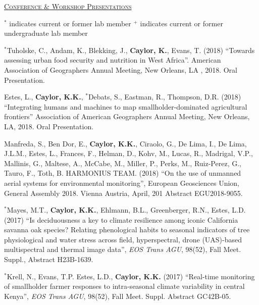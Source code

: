 \documentclass[10pt]{report}
\begin{document}
\vspace*{.1in}
\textsc{\underline{Conference \& Workshop Presentations}}

{ \small $^{*}$ indicates current or former lab member}
{ \small $^{+}$ indicates current or former undergraduate lab member}

\vspace*{.1in}

\begin{etaremune}

\item $^{*}$Tuholske, C., Andam, K., Blekking, J., \textbf{Caylor, K.}, Evans, T. (2018) ``Towards assessing urban food security and nutrition in West Africa''. American Association of Geographers Annual Meeting, New Orleans, LA , 2018. Oral Presentation.

\item Estes, L., \textbf{Caylor, K.K.}, $^{*}$Debats, S., Eastman, R., Thompson, D.R. (2018) ``Integrating humans and machines to map smallholder-dominated agricultural frontiers'' Association of American Geographers Annual Meeting, New Orleans, LA, 2018. Oral Presentation. 

\item Manfreda, S., Ben Dor, E., \textbf{Caylor, K.K.}, Ciraolo, G., De Lima, I., De Lima, J.L.M., Estes, L., Frances, F., Helman, D., Kohv, M., Lucas, R., Madrigal, V.P., Mallinis, G., Maltese, A., McCabe, M., Miller, P., Perks, M., Ruiz-Perez, G., Tauro, F., Toth, B. HARMONIUS TEAM. (2018) ``On the use of unmanned aerial systems for environmental monitoring'', European Geosciences Union, General Assembly 2018. Vienna Austria, April, 201 Abstract EGU2018-9055. 

\item $^{*}$Mayes, M.T., \textbf{Caylor, K.K.}, Ehlmann, B.L., Greenberger, R.N., Estes, L.D. (2017) ``Is deciduousness a key to climate resilience among iconic California savanna oak species? Relating phenological habits to seasonal indicators of tree physiological and water stress across field, hyperspectral, drone (UAS)-based multispectral and thermal image data'', \emph{EOS Trans AGU}, 98(52), Fall Meet. Suppl., Abstract H23B-1639.

\item $^{*}$Krell, N., Evans, T.P. Estes, L.D., \textbf{Caylor, K.K.} (2017) ``Real-time monitoring of smallholder farmer responses to intra-seasonal climate variability in central Kenya'', \emph{EOS Trans AGU}, 98(52), Fall Meet. Suppl. Abstract GC42B-05.


\end{etaremune}
\end{document}
